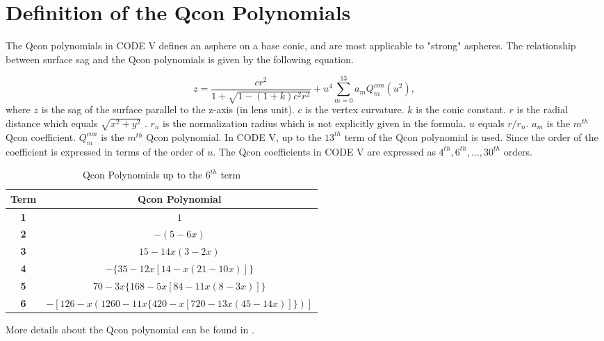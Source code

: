 \newpage

\section{Definition of the Qcon Polynomials} 
\label{apdx: chapter-5-system-Qcon-polynomial}

The Qcon polynomials in CODE V defines an asphere on a base conic, and are most applicable to "strong" aspheres. The relationship between surface sag and the Qcon polynomials is given by the following equation. 

\begin{equation}\label{apdx: Qcon formular}
z = \frac{c{r^2}}{1+\sqrt{1-(1+k){c^2}{r^2}}} + {u^4}\sum\limits_{m=0}^{13} {a_m}Q_{m}^{con}(u^2),
\end{equation}where $z$ is the sag of the surface parallel to the z-axis (in lens unit). $c$ is the vertex curvature. $k$ is the conic constant. $r$ is the radial distance which equals $\sqrt{x^2+y^2}$ . $r_n$ is the normalization radius which is not explicitly given in the formula. $u$ equals $r/r_n$. $a_m$ is the $m^{th}$ Qcon coefficient. $Q^{con}_m$ is the $m^{th}$ Qcon polynomial. In CODE V, up to the $13^{th}$ term of the Qcon polynomial is used. Since the order of the coefficient is expressed in terms of the order of $u$. The Qcon coefficients in CODE V are expressed as $4^{th}, 6^{th}, ..., 30^{th}$ orders.  

\begin{table}[h!]
    \centering
  \captionsetup{justification=centering}
    \caption{Qcon Polynomials up to the $6^{th}$ term}
    \label{apdx table: Qcon Polynomial terms}
    \vspace{-1em}
    \begin{adjustbox}{max width=\textwidth, center}
    \begin{tabular}{c c }
    \hline 
     \textbf{Term} & \textbf{Qcon Polynomial} \\ 
     \hline
      \textbf{1} & $1$ \\
      \textbf{2} & $-(5-6x)$\\
  	  \textbf{3} & $15-14x(3-2x)$	\\
      \textbf{4} & $-\{35-12x[14-x(21-10x)]\}$\\
      \textbf{5} & $70 - 3x\{168 - 5x[84-11x(8-3x)]\}$\\
      \textbf{6} & $-[126-x(1260-11x\{420-x[720-13x(45-14x)]\})]$\\
    \hline
    \end{tabular}
    \end{adjustbox}
\end{table}

More details about the Qcon polynomial can be found in \cite{ForbesOE07}.

\newpage


